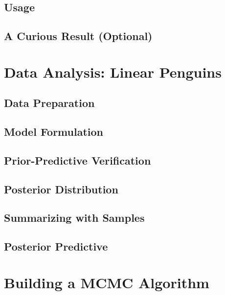 \documentclass[]{article}
\begin{document}
\subsection{Usage}


\subsection{A Curious Result (Optional)}


\section{Data Analysis: Linear Penguins}

\subsection{Data Preparation}

\subsection{Model Formulation}


\subsection{Prior-Predictive Verification}


\subsection{Posterior Distribution}


\subsection{Summarizing with Samples}


\subsection{Posterior Predictive}


\section{Building a MCMC Algorithm}
\end{document}

